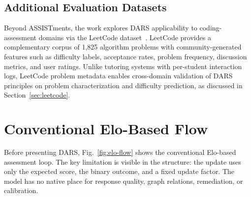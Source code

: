 \documentclass[conference]{IEEEtran}
\begin{document}
\subsection{Additional Evaluation Datasets}
Beyond ASSISTments, the work explores DARS applicability to coding-assessment domains via the LeetCode dataset~\cite{leetcode}. LeetCode provides a complementary corpus of 1,825 algorithm problems with community-generated features such as difficulty labels, acceptance rates, problem frequency, discussion metrics, and user ratings. Unlike tutoring systems with per-student interaction logs, LeetCode problem metadata enables cross-domain validation of DARS principles on problem characterization and difficulty prediction, as discussed in Section~\ref{sec:leetcode}.

\section{Conventional Elo-Based Flow}
Before presenting DARS, Fig.~\ref{fig:elo-flow} shows the conventional Elo-based assessment loop. The key limitation is visible in the structure: the update uses only the expected score, the binary outcome, and a fixed update factor. The model has no native place for response quality, graph relations, remediation, or calibration.
\end{document}
